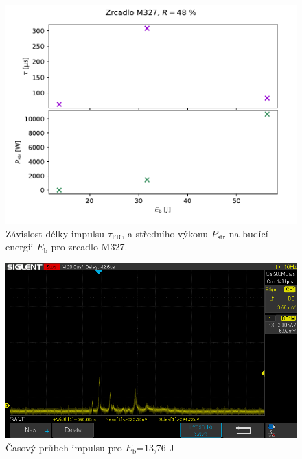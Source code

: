 \begin{figure}[H] 
	\centering
	\includegraphics[scale = 0.7]{img/optimalni_zrcadlo.pdf} 
	\caption{Závislost délky impulsu $\tau_\mathrm{FR}$, a středního výkonu $P_\mathrm{str}$ na budící energii $E_\mathrm{b}$ pro zrcadlo M327.} 
	\label{fig:optimalni_zrcadlo}
\end{figure}

\begin{figure}[H] 
	\centering
	\includegraphics[scale = 0.5]{img/SDS00002.png} 
	\caption{Časový průbeh impulsu pro $E_\mathrm{b}$=13,76 J} 
	\label{fig:cas_1}
\end{figure}

